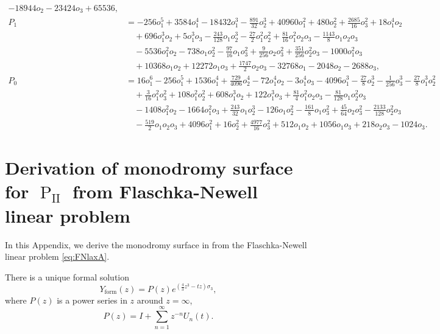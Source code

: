 \documentclass[a4paper,reqno]{amsart}
\numberwithin{equation}{section}
\newcommand{\pain}[1]{\operatorname{P}_{\mathrm{#1}}}
\numberwithin{equation}{section}
\begin{document}
\begin{align*}
    -18944 o_2
    -23424 o_3
    +65536, \\
    P_{1} &= 
    -256 o_1^5
    +3584 o_1^4
    -18432 o_1^3
    -\frac{891 }{32}o_2^3 
    +40960 o_1^2
    +480 o_2^2
    +\frac{2685 }{16}o_3^2
    +18 o_1^4 o_2 
    \\
    &\quad 
    +696 o_1^3 o_2 
    +5 o_1^3 o_3 
    -\frac{243}{128} o_1 o_2^3
    -\frac{27}{2} o_1^2 o_2^2 
    +\frac{81}{16} o_1^2 o_2 o_3 
    -\frac{1143}{8} o_1 o_2 o_3 
    \\
    &\quad 
    -5536 o_1^2 o_2 
    -738 o_1 o_2^2 
    -\frac{97}{16}  o_1 o_3^2
    +\frac{9}{256}  o_2 o_3^2
    +\frac{351}{256} o_2^2 o_3
    -1000 o_1^2 o_3 
     \\
    &\quad    
    +10368 o_1 o_2 
    +12272  o_1 o_3
    +\frac{1747 }{2}o_2 o_3
    -32768 o_1
    -2048 o_2
    -2688 o_3
    , 
    \\
    P_{0} &= 
    16 o_1^6
    -256 o_1^5
    +1536 o_1^4
     +\frac{729 }{4096}o_2^4
   -72 o_1^4 o_2 
    -3 o_1^4 o_3 
    -4096 o_1^3
    -\frac{27 }{8} o_2^3
    -\frac{1}{256} o_3^3
    -\frac{27}{8} o_1^3 o_2^2 
    \\
    &\quad 
    +\frac{3}{16}  o_1^2 o_3^2
    +108 o_1^2 o_2^2 
    +608 o_1^3 o_2 
    +122  o_1^3 o_3
    +\frac{81}{4} o_1^2 o_2 o_3 
     -\frac{81}{128} o_1 o_2^2 o_3 
    \\
    &\quad 
    -1408 o_1^2 o_2 
   -1664 o_1^2 o_3 
    +\frac{243}{32} o_1 o_2^3
    -126 o_1 o_2^2 
    -\frac{161}{8} o_1 o_3^2
    +\frac{45}{64} o_2 o_3^2
    -\frac{2133}{128} o_2^2 o_3
    \\
    &\quad
    -\frac{519}{2} o_1 o_2 o_3 
    +4096 o_1^2
    +16 o_2^2
    +\frac{4977 }{16}o_3^2
    +512 o_1 o_2 
    +1056 o_1 o_3 
    +218 o_2 o_3
    -1024 o_3
    .
\end{align*}
\endgroup

\section{Derivation of monodromy surface for $\pain{II}$ from Flaschka-Newell linear problem} \label{app:derivationofmonodromysurfaceFN}
In this Appendix, we derive the monodromy surface in 
  from the Flaschka-Newell linear problem \eqref{eq:FNlaxA}.


There is a unique formal solution
\begin{equation*}
    Y_{\text{form}}(z)=P(z)e^{(\frac{4}{3}z^3-tz)\sigma_3},
\end{equation*}
where $P(z)$ is a power series in $z$ around $z=\infty$,
\begin{equation*}
    P(z)=I+\sum_{n=1}^\infty z^{-n}U_n(t).
\end{equation*}
\end{document}
